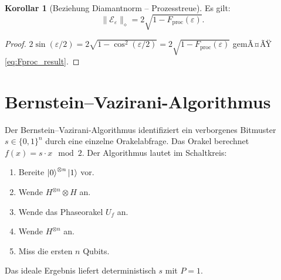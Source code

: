 ﻿\documentclass[11pt,a4paper]{article}
\theoremstyle{definition}
\newtheorem{corollary}[theorem]{Korollar}
\newcommand{\eps}{\varepsilon}
\begin{document}
\begin{corollary}[Beziehung Diamantnorm -- Prozesstreue]
  Es gilt:
  \begin{equation}
    \|\mathcal{E}_\eps\|_\diamond = 2\sqrt{1 - F_{\!\mathrm{proc}}(\eps)}.
    \label{eq:diamond_fproc}
  \end{equation}
\end{corollary}

\begin{proof}
  $2\sin(\eps/2) = 2\sqrt{1-\cos^2(\eps/2)} = 2\sqrt{1-F_{\mathrm{proc}}(\eps)}$
  gemÃ¤ÃŸ \eqref{eq:Fproc_result}.
\end{proof}

\section{Bernstein--Vazirani-Algorithmus}
\label{sec:bv}

Der Bernstein--Vazirani-Algorithmus \cite{BV1993} identifiziert ein verborgenes
Bitmuster $s\in\{0,1\}^n$ durch eine einzelne Orakelabfrage.
Das Orakel berechnet $f(x) = s\cdot x \mod 2$.
Der Algorithmus lautet im Schaltkreis:
\begin{enumerate}
  \item Bereite $\ket{0}^{\otimes n}\ket{1}$ vor.
  \item Wende $H^{\otimes n}\otimes H$ an.
  \item Wende das Phaseorakel $U_f$ an.
  \item Wende $H^{\otimes n}$ an.
  \item Miss die ersten $n$ Qubits.
\end{enumerate}
Das ideale Ergebnis liefert deterministisch $s$ mit $P = 1$.
\end{document}
